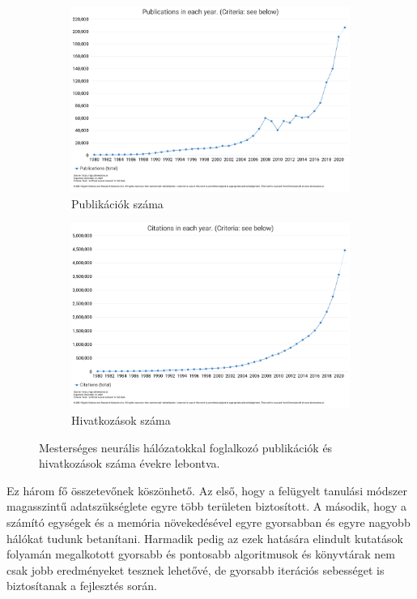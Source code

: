 \begin{figure}
    \centering
    \begin{subfigure}[b]{0.45\linewidth}
        \includegraphics[width=\linewidth]{figures/dimensions_ai_artificial_neural_network_publications.png}
        \caption{Publikációk száma}
    \end{subfigure}
    \begin{subfigure}[b]{0.45\linewidth}
        \includegraphics[width=\linewidth]{figures/dimensions_ai_artificial_neural_network_citations.png}
        \caption{Hivatkozások száma}
    \end{subfigure}
    \caption{Mesterséges neurális hálózatokkal foglalkozó publikációk és hivatkozások száma évekre lebontva.}
    \label{fig:neural_network_article_numbers}
\end{figure}

Ez három fő összetevőnek köszönhető. Az első, hogy a felügyelt tanulási módszer magasszintű adatszükséglete egyre több területen biztosított. A második, hogy a számító egységek és a memória növekedésével egyre gyorsabban és egyre nagyobb hálókat tudunk betanítani. Harmadik pedig az ezek hatására elindult kutatások folyamán megalkotott gyorsabb és pontosabb algoritmusok és könyvtárak nem csak jobb eredményeket tesznek lehetővé, de gyorsabb iterációs sebességet is biztosítanak a fejlesztés során.

